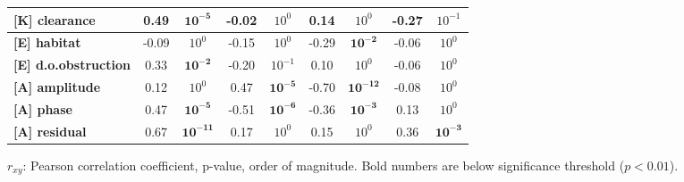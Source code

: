 \begin{table}[p]
\begin{tabular}{l @{$\quad$} cc @{$\quad$} cc @{$\quad$} cc @{$\quad$} cc}
\textbf{[K] clearance        } &                     0.49 &      $\mathbf{10^{-5}}$ &                    -0.02 &   $10^{0}$ &                     0.14 &   $10^{0}$ &                    -0.27 &  $10^{-1}$ \\
\midrule\textbf{[E] habitat          } &                    -0.09 &   $10^{0}$ &                    -0.15 &   $10^{0}$ &                    -0.29 &      $\mathbf{10^{-2}}$ &                    -0.06 &   $10^{0}$ \\
\textbf{[E] d.o.obstruction  } &                     0.33 &      $\mathbf{10^{-2}}$ &                    -0.20 &  $10^{-1}$ &                     0.10 &   $10^{0}$ &                    -0.06 &   $10^{0}$ \\
\midrule\textbf{[A] amplitude        } &                     0.12 &   $10^{0}$ &                     0.47 &      $\mathbf{10^{-5}}$ &                    -0.70 &     $\mathbf{10^{-12}}$ &                    -0.08 &   $10^{0}$ \\
\textbf{[A] phase            } &                     0.47 &      $\mathbf{10^{-5}}$ &                    -0.51 &      $\mathbf{10^{-6}}$ &                    -0.36 &      $\mathbf{10^{-3}}$ &                     0.13 &   $10^{0}$ \\
\textbf{[A] residual         } &                     0.67 &     $\mathbf{10^{-11}}$ &                     0.17 &   $10^{0}$ &                     0.15 &   $10^{0}$ &                     0.36 &      $\mathbf{10^{-3}}$ \\
\bottomrule
\end{tabular}\bigskip
\begin{flushleft}
$r_{xy}$: Pearson correlation coefficient,  p-value, order of magnitude. Bold numbers are below significance threshold ($p < 0.01$).
\end{flushleft}
\label{tab:correlations}
\end{table}



